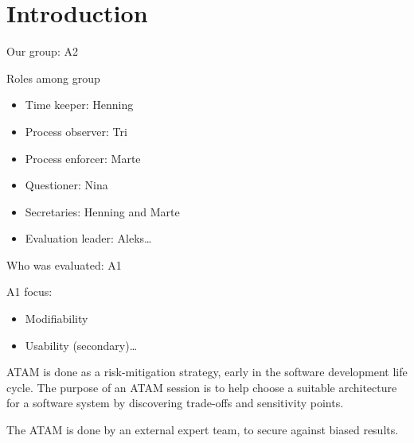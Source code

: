 \section{Introduction}
\label{sec:introduction}

Our group: A2

Roles among group
\begin{itemize}
  \item Time keeper: Henning
  \item Process observer: Tri
  \item Process enforcer: Marte
  \item Questioner: Nina
  \item Secretaries: Henning and Marte
  \item Evaluation leader: Aleks\ldots
\end{itemize}

Who was evaluated: A1


A1 focus: 
	\begin{itemize}
  \item Modifiability
  \item Usability (secondary)\ldots
\end{itemize}


ATAM is done as a risk-mitigation strategy, early in the software development life cycle. The purpose of an ATAM session is to help choose a suitable architecture for a software system by discovering trade-offs and sensitivity points. 

The ATAM is done by an external expert team, to secure against biased results. 